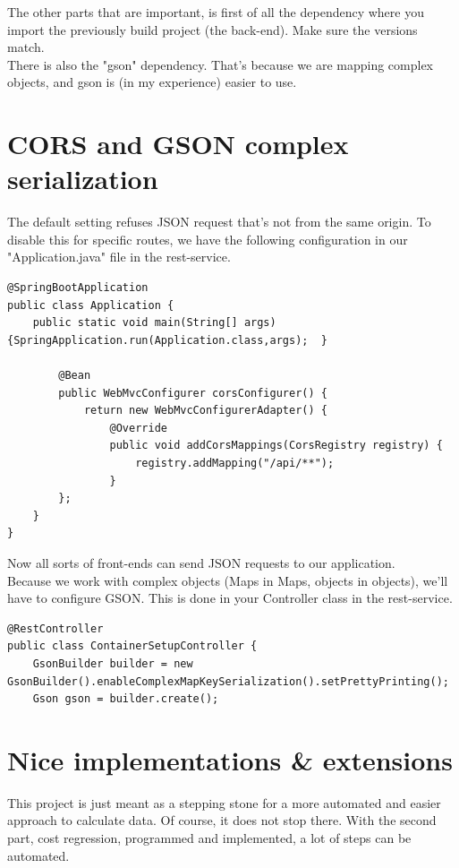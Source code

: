 \documentclass[a4paper,12pt]{article}
\begin{document}
The other parts that are important, is first of all the dependency where you import the previously build project (the back-end). Make sure the versions match. \\

There is also the "gson" dependency. That's because we are mapping complex objects, and gson is (in my experience) easier to use. 

\pagebreak
\section{CORS and GSON complex serialization}
The default setting refuses JSON request that's not from the same origin. To disable this for specific routes, we have the following configuration in our "Application.java" file in the rest-service.

\lstset{language=Java}
\begin{lstlisting}
@SpringBootApplication
public class Application {
	public static void main(String[] args) {SpringApplication.run(Application.class,args);	}
		
		@Bean
		public WebMvcConfigurer corsConfigurer() {
			return new WebMvcConfigurerAdapter() {
				@Override
				public void addCorsMappings(CorsRegistry registry) {
					registry.addMapping("/api/**");
				}
		};
	}
}
\end{lstlisting}

Now all sorts of front-ends can send JSON requests to our application. \\

Because we work with complex objects (Maps in Maps, objects in objects), we'll have to configure GSON. This is done in your Controller class in the rest-service.
\begin{lstlisting}
@RestController
public class ContainerSetupController {
	GsonBuilder builder = new GsonBuilder().enableComplexMapKeySerialization().setPrettyPrinting();
	Gson gson = builder.create();
\end{lstlisting}

\pagebreak

\section{Nice implementations \& extensions }
This project is just meant as a stepping stone for a more automated and easier approach to calculate data. Of course, it does not stop there. With the second part, cost regression, programmed and implemented, a lot of steps can be automated. \\
\end{document}
